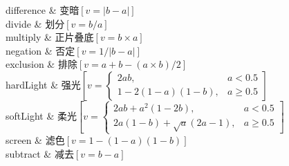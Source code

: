 difference
    &
变暗$\left[v=\left|b-a\right|\right]$
    \\

divide
    &
划分$\left[v=b/a\right]$
    \\

multiply
    &
正片叠底$\left[v=b\times{}a\right]$
    \\

negation
    &
否定$\left[v=1/\left|b-a\right|\right]$
    \\

exclusion
    &
排除$\left[v=a+b-(a\times{}b)/2\right]$
    \\

hardLight
    &
强光$\left[v=\begin{cases}
2ab, & a<0.5 \\ 
1-2(1-a)(1-b), & a\ge{}0.5
\end{cases}\right]$
    \\

softLight
    &
柔光$\left[v=\begin{cases}
2ab+a^2(1-2b), & a<0.5 \\ 
2a(1-b)+\sqrt{a}(2a-1), & a\ge{}0.5
\end{cases}\right]$
    \\

screen
    &
滤色$\left[v=1-(1-a)(1-b)\right]$
    \\

subtract
    &
减去$\left[v=b-a\right]$
    \\











